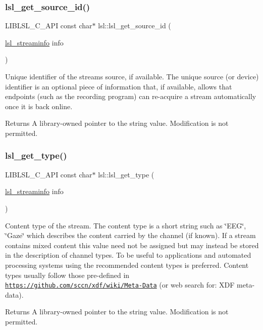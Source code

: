 \subsubsection{\texorpdfstring{lsl\+\_\+get\+\_\+source\+\_\+id()}{lsl\_get\_source\_id()}}
{\footnotesize\ttfamily L\+I\+B\+L\+S\+L\+\_\+\+C\+\_\+\+A\+PI const char$\ast$ lsl\+::lsl\+\_\+get\+\_\+source\+\_\+id (\begin{DoxyParamCaption}\item[{\hyperlink{namespacelsl_aa0a9ce9956061679949daa2e35aae2e8}{lsl\+\_\+streaminfo}}]{info }\end{DoxyParamCaption})}

Unique identifier of the stream\textquotesingle{}s source, if available. The unique source (or device) identifier is an optional piece of information that, if available, allows that endpoints (such as the recording program) can re-\/acquire a stream automatically once it is back online. \begin{DoxyReturn}{Returns}
A library-\/owned pointer to the string value. Modification is not permitted. 
\end{DoxyReturn}
\mbox{\label{namespacelsl_a417e01d26d64718513bc0ef2c58acf89}} 
\subsubsection{\texorpdfstring{lsl\+\_\+get\+\_\+type()}{lsl\_get\_type()}}
{\footnotesize\ttfamily L\+I\+B\+L\+S\+L\+\_\+\+C\+\_\+\+A\+PI const char$\ast$ lsl\+::lsl\+\_\+get\+\_\+type (\begin{DoxyParamCaption}\item[{\hyperlink{namespacelsl_aa0a9ce9956061679949daa2e35aae2e8}{lsl\+\_\+streaminfo}}]{info }\end{DoxyParamCaption})}

Content type of the stream. The content type is a short string such as \char`\"{}\+E\+E\+G\char`\"{}, \char`\"{}\+Gaze\char`\"{} which describes the content carried by the channel (if known). If a stream contains mixed content this value need not be assigned but may instead be stored in the description of channel types. To be useful to applications and automated processing systems using the recommended content types is preferred. Content types usually follow those pre-\/defined in \href{https://github.com/sccn/xdf/wiki/Meta-Data}{\tt https\+://github.\+com/sccn/xdf/wiki/\+Meta-\/\+Data} (or web search for\+: X\+DF meta-\/data). \begin{DoxyReturn}{Returns}
A library-\/owned pointer to the string value. Modification is not permitted. 
\end{DoxyReturn}
\mbox{\label{namespacelsl_a6e18a9b1c544932e96179a44bb1f31ec}} 
